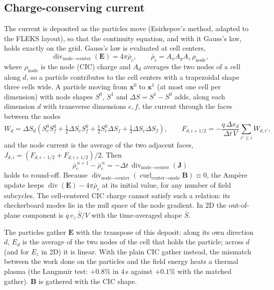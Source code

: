 \documentclass[a4paper, 11pt]{article}
\begin{document}
\subsection{Charge-conserving current}

The current is deposited as the particles move (Esirkepov's method, adapted to the FLEKS layout), so that the continuity equation, and with it Gauss's law, holds exactly on the grid. Gauss's law is evaluated at cell centers,
\begin{equation}
\operatorname{div}_{\text{node}\to\text{center}}(\mathbf{E}) = 4\pi \bar\rho_c, \qquad
\bar\rho_c = A_x A_y A_z\, \rho_{\text{node}},
\end{equation}
where $\rho_{\text{node}}$ is the node (CIC) charge and $A_d$ averages the two nodes of a cell along $d$, so a particle contributes to the cell centers with a trapezoidal shape three cells wide. A particle moving from $\mathbf{x}^0$ to $\mathbf{x}^1$ (at most one cell per dimension) with node shapes $S^0$, $S^1$ and $\Delta S = S^1 - S^0$ adds, along each dimension $d$ with transverse dimensions $e, f$, the current through the faces between the nodes
\begin{equation}
W_d = \Delta S_d \left( S^0_e S^0_f + \tfrac12 \Delta S_e S^0_f + \tfrac12 S^0_e \Delta S_f + \tfrac13 \Delta S_e \Delta S_f \right), \qquad
F_{d,i+1/2} = -\frac{q\,\Delta x_d}{\Delta t\, V} \sum_{i' \le i} W_{d,i'},
\end{equation}
and the node current is the average of the two adjacent faces, $J_{d,i} = (F_{d,i-1/2} + F_{d,i+1/2})/2$. Then
\begin{equation}
\bar\rho_c^{\,n+1} - \bar\rho_c^{\,n} = -\Delta t\,\operatorname{div}_{\text{node}\to\text{center}}(\mathbf{J})
\end{equation}
holds to round-off. Because $\operatorname{div}_{\text{node}\to\text{center}}(\operatorname{curl}_{\text{center}\to\text{node}}\mathbf{B}) \equiv 0$, the Amp\`ere update keeps $\operatorname{div}(\mathbf{E}) - 4\pi\bar\rho_c$ at its initial value, for any number of field subcycles. The cell-centered CIC charge cannot satisfy such a relation: its checkerboard modes lie in the null space of the node gradient. In 2D the out-of-plane component is $q\,v_z\,\bar S/V$ with the time-averaged shape $\bar S$.

The particles gather $\mathbf{E}$ with the transpose of this deposit: along its own direction $d$, $E_d$ is the average of the two nodes of the cell that holds the particle; across $d$ (and for $E_z$ in 2D) it is linear. With the plain CIC gather instead, the mismatch between the work done on the particles and the field energy heats a thermal plasma (the Langmuir test: $+0.8\%$ in $4\,$s against $+0.1\%$ with the matched gather). $\mathbf{B}$ is gathered with the CIC shape.
\end{document}
